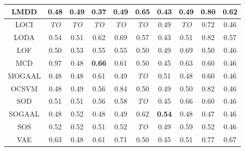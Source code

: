 \begin{table*}[!t]
\begin{center}
\begin{small}
\begin{sc}
\begin{tabular}{|c|c|c|c|c|c|c|c|c|c|}
\hline
                LMDD &          0.48 &               0.49 &          0.37 &                0.49 &          0.65 &               0.43 &            0.49 &          0.80 &          0.62 \\
\hline
                LOCI &   \textit{TO} &        \textit{TO} &   \textit{TO} &         \textit{TO} &   \textit{TO} &               0.49 &     \textit{TO} &          0.72 &          0.46 \\
\hline
                LODA &          0.54 &               0.51 &          0.62 &                0.69 &          0.57 &               0.43 &            0.51 &          0.82 &          0.57 \\
\hline
                LOF &          0.50 &               0.53 &          0.55 &                0.55 &          0.50 &               0.49 &            0.69 &          0.50 &          0.46 \\
\hline
                MCD &          0.97 &               0.48 & \textbf{0.66} &                0.61 &          0.50 &               0.45 &            0.63 &          0.60 &          0.46 \\
\hline
        MOGAAL &          0.48 &               0.48 &          0.61 &                0.49 &   \textit{TO} &               0.51 &            0.48 &          0.60 &          0.46 \\
\hline
                OCSVM &          0.48 &               0.49 &          0.56 &                0.84 &          0.50 &               0.49 &            0.50 &          0.82 &          0.46 \\
\hline
                SOD &          0.51 &               0.51 &          0.56 &                0.58 &   \textit{TO} &               0.45 &            0.66 &          0.60 &          0.46 \\
\hline
        SOGAAL &          0.48 &               0.52 &          0.48 &                0.49 &          0.62 &      \textbf{0.54} &            0.48 &          0.47 &          0.46 \\
\hline
                SOS &          0.52 &               0.52 &          0.51 &                0.52 &   \textit{TO} &               0.49 &            0.59 &          0.52 &          0.46 \\
\hline
                VAE &          0.63 &               0.48 &          0.61 &                0.71 &          0.50 &               0.45 &            0.51 &          0.77 &          0.67 \\
\hline
\end{tabular}
\end{sc}
\end{small}
\end{center}
\vskip -0.1in
\end{table*}




